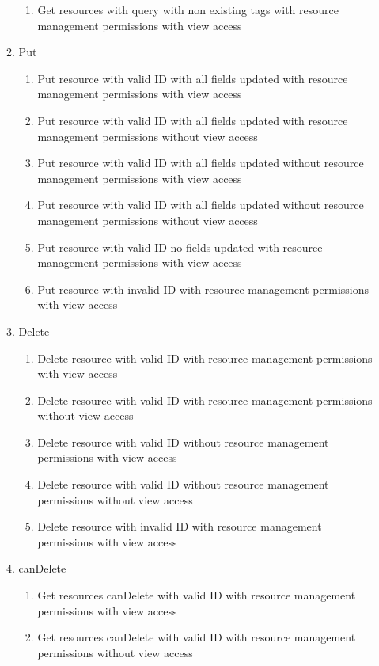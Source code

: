 \documentclass[12pt]{article}
\begin{document}
\begin{enumerate}
\begin{enumerate}
\begin{enumerate}
            \item Get resources with query with non existing tags with resource management permissions with view access    
        \end{enumerate}
        \item Put
        \begin{enumerate}
            \item Put resource with valid ID with all fields updated with resource management permissions with view access
            \item Put resource with valid ID with all fields updated with resource management permissions without view access
            \item Put resource with valid ID with all fields updated without resource management permissions with view access
            \item Put resource with valid ID with all fields updated without resource management permissions without view access
            \item Put resource with valid ID no fields updated with resource management permissions with view access
            \item Put resource with invalid ID with resource management permissions with view access
        \end{enumerate}
        \item Delete
        \begin{enumerate}
            \item Delete resource with valid ID with resource management permissions with view access
            \item Delete resource with valid ID with resource management permissions without view access
            \item Delete resource with valid ID without resource management permissions with view access
            \item Delete resource with valid ID without resource management permissions without view access
            \item Delete resource with invalid ID with resource management permissions with view access
        \end{enumerate}
        \item canDelete
            \begin{enumerate}
            \item Get resources canDelete with valid ID with resource management permissions with view access
            \item Get resources canDelete with valid ID with resource management permissions without view access

\end{enumerate}
\end{enumerate}
\end{enumerate}
\end{document}
